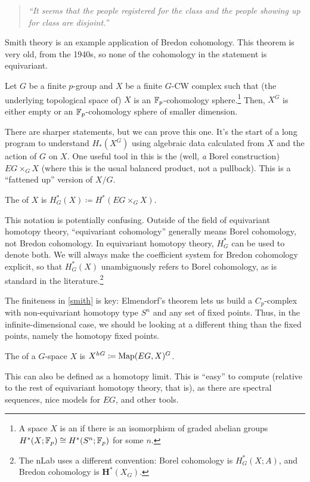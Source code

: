 \begin{quote}\textit{
	``It seems that the people registered for the class and the people showing up for class are disjoint.''
}\end{quote}
Smith theory is an example application of Bredon cohomology. This theorem is very old, from the 1940s, so none of
the cohomology in the statement is equivariant.
\begin{thm}[Smith]
\label{smith}
Let $G$ be a finite $p$-group and $X$ be a finite $G$-CW complex such that (the underlying topological space of)
$X$ is an $\mathbb F_p$-cohomology sphere.\footnote{A space $X$ is an  if there is an
isomorphism of graded abelian groups $H^*(X;\mathbb F_p)\cong H^*(S^n;\mathbb F_p)$ for some $n$.} Then, $X^G$ is either empty or
an $\mathbb F_p$-cohomology sphere of smaller dimension.
\end{thm}
There are sharper statements, but we can prove this one. It's the start of a long program to understand $H_*(X^G)$
using algebraic data calculated from $X$ and the action of $G$ on $X$. One useful tool in this is the  (well, \emph a Borel construction) $EG\times_G X$ (where this is the usual balanced product, not a
pullback). This is a ``fattened up'' version of $X/G$.
\begin{defn}
The  of $X$ is $H_G^*(X) \coloneqq H^*(EG\times_G X)$.
\end{defn}
\begin{warn}
This notation is potentially confusing. Outside of the field of equivariant homotopy theory, ``equivariant
cohomology'' generally means Borel cohomology, not Bredon cohomology. In equivariant homotopy theory, $H_G^*$ can
be used to denote both. We will always make the coefficient system for Bredon cohomology explicit, so that
$H_G^*(X)$ unambiguously refers to Borel cohomology, as is standard in the literature.\footnote{The nLab uses a
different convention: Borel cohomology is $H_G^*(X;A)$, and Bredon cohomology is $\mathbf H^*(X_G)$.}
\end{warn}
The finiteness in \cref{smith} is key: Elmendorf's theorem lets us build a $C_p$-complex with non-equivariant
homotopy type $S^n$ and any set of fixed points. Thus, in the infinite-dimensional case, we should be looking at a
different thing than the fixed points, namely the homotopy fixed points.
\begin{defn}
The  of a $G$-space $X$ is $X^{hG}\coloneqq \operatorname{Map}(EG, X)^G$.
\end{defn}
This can also be defined as a homotopy limit. This is ``easy'' to compute (relative to the rest of equivariant
homotopy theory, that is), as there are spectral sequences, nice models for $EG$, and other tools.

